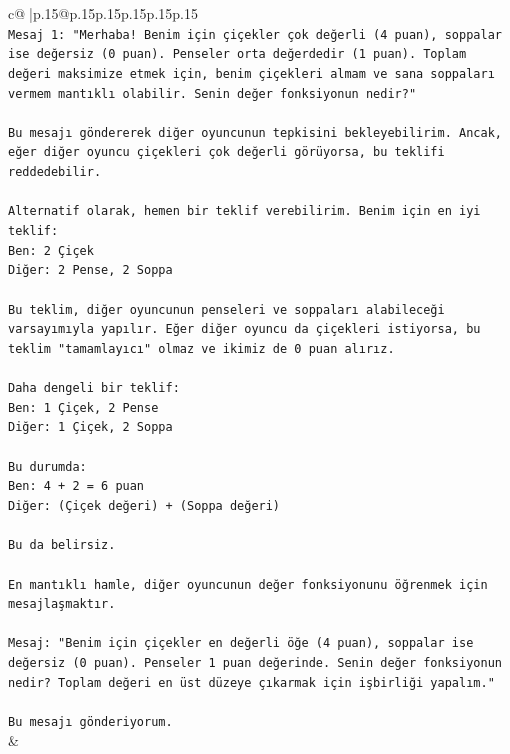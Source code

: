 \documentclass{article}
\begin{document}
{\begin{supertabular}{c@{$\;$}|p{.15\linewidth}@{}p{.15\linewidth}p{.15\linewidth}p{.15\linewidth}p{.15\linewidth}p{.15\linewidth}}
{{{\\ 
\texttt{Mesaj 1: "Merhaba! Benim için çiçekler çok değerli (4 puan), soppalar ise değersiz (0 puan). Penseler orta değerdedir (1 puan). Toplam değeri maksimize etmek için, benim çiçekleri almam ve sana soppaları vermem mantıklı olabilir. Senin değer fonksiyonun nedir?"} \\
\\ 
\texttt{Bu mesajı göndererek diğer oyuncunun tepkisini bekleyebilirim. Ancak, eğer diğer oyuncu çiçekleri çok değerli görüyorsa, bu teklifi reddedebilir.} \\
\\ 
\texttt{Alternatif olarak, hemen bir teklif verebilirim. Benim için en iyi teklif:} \\
\texttt{Ben: 2 Çiçek} \\
\texttt{Diğer: 2 Pense, 2 Soppa} \\
\\ 
\texttt{Bu teklim, diğer oyuncunun penseleri ve soppaları alabileceği varsayımıyla yapılır. Eğer diğer oyuncu da çiçekleri istiyorsa, bu teklim "tamamlayıcı" olmaz ve ikimiz de 0 puan alırız.} \\
\\ 
\texttt{Daha dengeli bir teklif:} \\
\texttt{Ben: 1 Çiçek, 2 Pense} \\
\texttt{Diğer: 1 Çiçek, 2 Soppa} \\
\\ 
\texttt{Bu durumda:} \\
\texttt{Ben: 4 + 2 = 6 puan} \\
\texttt{Diğer: (Çiçek değeri) + (Soppa değeri)} \\
\\ 
\texttt{Bu da belirsiz.} \\
\\ 
\texttt{En mantıklı hamle, diğer oyuncunun değer fonksiyonunu öğrenmek için mesajlaşmaktır.} \\
\\ 
\texttt{Mesaj: "Benim için çiçekler en değerli öğe (4 puan), soppalar ise değersiz (0 puan). Penseler 1 puan değerinde. Senin değer fonksiyonun nedir? Toplam değeri en üst düzeye çıkarmak için işbirliği yapalım."} \\
\\ 
\texttt{Bu mesajı gönderiyorum.} \\
            }
        }
    }
    & \\ \\


\end{supertabular}}
\end{document}
